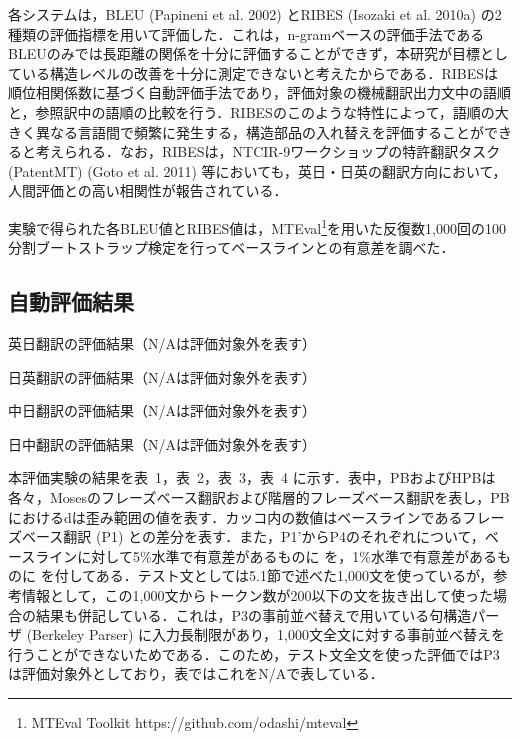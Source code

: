 \documentclass[japanese]{jnlp_1.4}
\begin{document}
各システムは，BLEU (Papineni et al. 2002) とRIBES (Isozaki et al. 
2010a) の2種類の評価指標を用いて評価した．これは，n-gramベースの評価手法であるBLEUのみでは長距離の関係を十分に評価することができず，本研究が目標としている構造レベルの改善を十分に測定できないと考えたからである．RIBESは順位相関係数に基づく自動評価手法であり，評価対象の機械翻訳出力文中の語順と，参照訳中の語順の比較を行う．RIBESのこのような特性によって，語順の大きく異なる言語間で頻繁に発生する，構造部品の入れ替えを評価することができると考えられる．なお，RIBESは，NTCIR-9ワークショップの特許翻訳タスク (PatentMT) (Goto 
et al. 
2011) 等においても，英日・日英の翻訳方向において，人間評価との高い相関性が報告されている．

実験で得られた各BLEU値とRIBES値は，MTEval\footnote{MTEval Toolkit https://github.com/odashi/mteval}を用いた反復数1,000回の100分割ブートストラップ検定を行ってベースラインとの有意差を調べた．


\subsection{自動評価結果}

\begin{table}[p]
\caption{英日翻訳の評価結果（N/Aは評価対象外を表す）}
\label{tab01}

\vspace{-0.3\Cvs}
\end{table}
\begin{table}[p]
\caption{日英翻訳の評価結果（N/Aは評価対象外を表す）}
\label{tab02}

\vspace{-0.3\Cvs}
\end{table}
\begin{table}[p]
\caption{中日翻訳の評価結果（N/Aは評価対象外を表す）}
\label{tab03}

\vspace{-0.3\Cvs}
\end{table}
\begin{table}[p]
\caption{日中翻訳の評価結果（N/Aは評価対象外を表す）}
\label{tab04}

\end{table}

本評価実験の結果を表~1，表~2，表~3，表~4 に示す．表中，PBおよびHPBは各々，Mosesのフレーズベース翻訳および階層的フレーズベース翻訳を表し，PBにおけるdは歪み範囲の値を表す．カッコ内の数値はベースラインであるフレーズベース翻訳 (P1) との差分を表す．また，P1'からP4のそれぞれについて，ベースラインに対して5{\%}水準で有意差があるものに\textdagger 
を，1{\%}水準で有意差があるものに\textdaggerdbl 
を付してある．テスト文としては5.1節で述べた1,000文を使っているが，参考情報として，この1,000文からトークン数が200以下の文を抜き出して使った場合の結果も併記している．これは，P3の事前並べ替えで用いている句構造パーザ (Berkeley 
Parser) に入力長制限があり，1,000文全文に対する事前並べ替えを行うことができないためである．このため，テスト文全文を使った評価ではP3は評価対象外としており，表ではこれをN/Aで表している．
\end{document}
